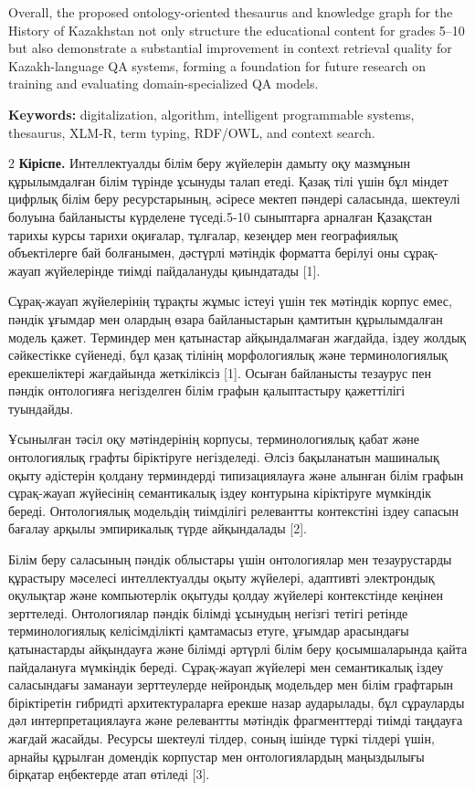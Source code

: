 Overall, the proposed ontology-oriented thesaurus and knowledge graph
for the History of Kazakhstan not only structure the educational content
for grades 5--10 but also demonstrate a substantial improvement in
context retrieval quality for Kazakh-language QA systems, forming a
foundation for future research on training and evaluating
domain-specialized QA models.

{\bfseries Keywords:} digitalization, algorithm, intelligent programmable
systems, thesaurus, XLM-R, term typing, RDF/OWL, and context search.

\begin{multicols}{2}
{\bfseries Кіріспе.} Интеллектуалды білім беру жүйелерін дамыту оқу
мазмұнын құрылымдалған білім түрінде ұсынуды талап етеді. Қазақ тілі
үшін бұл міндет цифрлық білім беру ресурстарының, әсіресе мектеп пәндері
саласында, шектеулі болуына байланысты күрделене түседі.5-10 сыныптарға
арналған Қазақстан тарихы курсы тарихи оқиғалар, тұлғалар, кезеңдер мен
географиялық объектілерге бай болғанымен, дәстүрлі мәтіндік форматта
берілуі оны сұрақ-жауап жүйелерінде тиімді пайдалануды қиындатады
{[}1{]}.

Сұрақ-жауап жүйелерінің тұрақты жұмыс істеуі үшін тек мәтіндік корпус
емес, пәндік ұғымдар мен олардың өзара байланыстарын қамтитын
құрылымдалған модель қажет. Терминдер мен қатынастар айқындалмаған
жағдайда, іздеу жолдық сәйкестікке сүйенеді, бұл қазақ тілінің
морфологиялық және терминологиялық ерекшеліктері жағдайында жеткіліксіз
{[}1{]}. Осыған байланысты тезаурус пен пәндік онтологияға негізделген
білім графын қалыптастыру қажеттілігі туындайды.

Ұсынылған тәсіл оқу мәтіндерінің корпусы, терминологиялық қабат және
онтологиялық графты біріктіруге негізделеді. Әлсіз бақыланатын машиналық
оқыту әдістерін қолдану терминдерді типизациялауға және алынған білім
графын сұрақ-жауап жүйесінің семантикалық іздеу контурына кіріктіруге
мүмкіндік береді. Онтологиялық модельдің тиімділігі релевантты
контекстіні іздеу сапасын бағалау арқылы эмпирикалық түрде айқындалады
{[}2{]}.

Білім беру саласының пәндік облыстары үшін онтологиялар мен
тезаурустарды құрастыру мәселесі интеллектуалды оқыту жүйелері,
адаптивті электрондық оқулықтар және компьютерлік оқытуды қолдау
жүйелері контекстінде кеңінен зерттеледі. Онтологиялар пәндік білімді
ұсынудың негізгі тетігі ретінде терминологиялық келісімділікті
қамтамасыз етуге, ұғымдар арасындағы қатынастарды айқындауға және
білімді әртүрлі білім беру қосымшаларында қайта пайдалануға мүмкіндік
береді. Сұрақ-жауап жүйелері мен семантикалық іздеу саласындағы заманауи
зерттеулерде нейрондық модельдер мен білім графтарын біріктіретін
гибридті архитектураларға ерекше назар аударылады, бұл сұрауларды дәл
интерпретациялауға және релевантты мәтіндік фрагменттерді тиімді
таңдауға жағдай жасайды. Ресурсы шектеулі тілдер, соның ішінде түркі
тілдері үшін, арнайы құрылған домендік корпустар мен онтологиялардың
маңыздылығы бірқатар еңбектерде атап өтіледі {[}3{]}.


\end{multicols}
